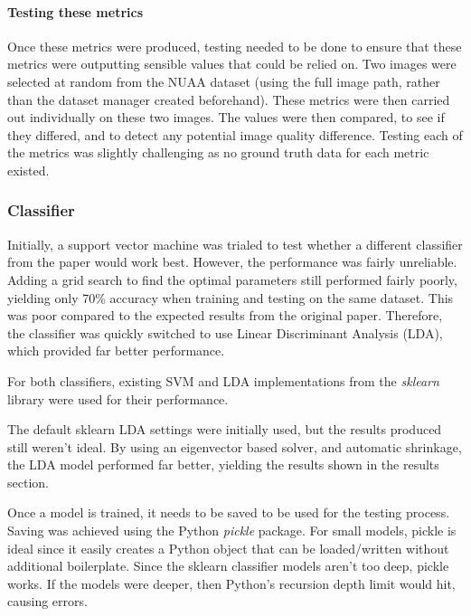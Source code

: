 \documentclass[10pt,a4paper]{article}
\begin{document}
            \paragraph{Testing these metrics}
            Once these metrics were produced, testing needed to be done to ensure that these metrics were outputting sensible values that could be relied on.
            Two images were selected at random from the NUAA dataset (using the full image path, rather than the dataset manager created beforehand). These metrics
            were then carried out individually on these two images. The values were then compared, to see if they differed, and to detect any potential image quality difference. 
            Testing each of the metrics was slightly challenging as no ground truth data for each metric existed.


        \subsubsection{Classifier}
            Initially, a support vector machine was trialed to test whether a different classifier from the paper \cite{ImageQualityAssessmentTest} would work best. However,
            the performance was fairly unreliable. Adding a grid search to find the optimal parameters still performed fairly poorly, yielding only 70\% accuracy when training and testing on the same dataset. This was poor compared to the expected results from the original paper. Therefore, the classifier was quickly switched to
            use Linear Discriminant Analysis (LDA), which provided far better performance.

            For both classifiers, existing SVM and LDA implementations from the \emph{sklearn} library were used for their performance. 
            
            The default sklearn LDA settings were initially used, but the results produced still weren't ideal. By using an eigenvector based solver, and automatic shrinkage, the LDA model performed far better, yielding the results
            shown in the results section.

            Once a model is trained, it needs to be saved to be used for the testing process. Saving was achieved using the Python \emph{pickle} package. For small models, pickle is ideal since it easily creates a Python object that can be loaded/written
            without additional boilerplate. Since the sklearn classifier models aren't too deep, pickle works. If the models were deeper, then Python's recursion depth limit would hit, causing errors. 
     
\end{document}
